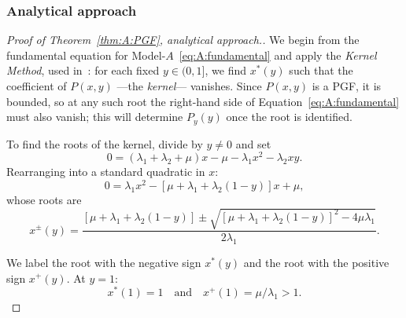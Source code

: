 \subsubsection{Analytical approach}\label{sssec:A:analytical}

\begin{proof}[Proof of Theorem~\ref{thm:A:PGF}, analytical approach.]
    We begin from the fundamental equation for Model-$A$~\eqref{eq:A:fundamental} and apply the \emph{Kernel Method}, used in~\cite{cohen1956delay}: for each fixed $y\in(0,1]$, we find $x^*(y)$ such that the coefficient of $P(x,y)$ ---the \emph{kernel}--- vanishes. Since $P(x,y)$ is a PGF, it is bounded, so at any such root the right-hand side of Equation~\eqref{eq:A:fundamental} must also vanish; this will determine $P_y(y)$ once the root is identified.

    To find the roots of the kernel, divide by $y\neq 0$ and set
    \begin{equation*}
             0 =  (\lambda_1 + \lambda_2 + \mu)x - \mu  -\lambda_1x^2 - \lambda_2xy.
    \end{equation*}
    Rearranging into a standard quadratic in $x$:
    \begin{equation*}
          0 =  \lambda_1 x^2 - \left[ \mu + \lambda_1 + \lambda_2 (1-y) \right] x + \mu,
    \end{equation*}
    whose roots are
    \begin{equation*}
        x^{\pm}(y) = \frac{
            \left[\mu + \lambda_1 + \lambda_2 (1-y) \right] \pm \sqrt{
                \left[\mu + \lambda_1 + \lambda_2 (1-y) \right]^2 - 4  \mu \lambda_1
            }
        }{
            2\lambda_1
        }.
    \end{equation*}
    
    We label the root with the negative sign $x^*(y)$ and the root with the positive
    sign $x^+(y)$. At $y=1$:
    \begin{equation*}
        x^*(1) = 1 \quad \text{and} \quad x^+(1) = \mu/\lambda_1 > 1.
    \end{equation*}
    

\end{proof}
